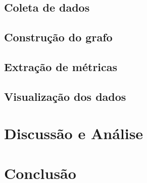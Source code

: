 \documentclass[journal]{IEEEtran}
\begin{document}
\subsection{Coleta de dados}

\subsection{Construção do grafo}

\subsection{Extração de métricas}

\subsection{Visualização dos dados}



\section{Discussão e Análise}



\section{Conclusão}
\label{sec:conclusao}
\end{document}
